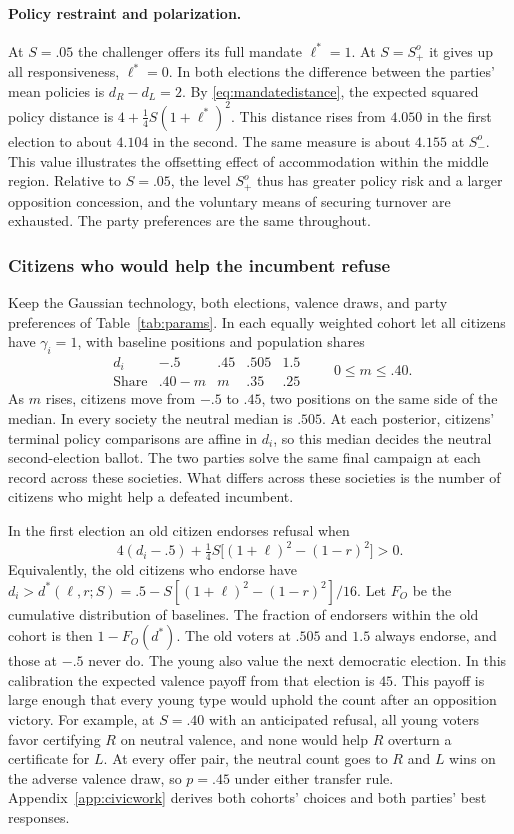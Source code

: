 \documentclass[11pt,letterpaper]{article}
\begin{document}
\paragraph{Policy restraint and polarization.}
At $S=.05$ the challenger offers its full mandate $\ell^*=1$. At $S=S_+^o$ it gives up all responsiveness, $\ell^*=0$. In both elections the difference between the parties' mean policies is $d_R-d_L=2$. By \eqref{eq:mandatedistance}, the expected squared policy distance is $4+\tfrac14 S(1+\ell^*)^2$. This distance rises from $4.050$ in the first election to about $4.104$ in the second. The same measure is about $4.155$ at $S_-^o$. This value illustrates the offsetting effect of accommodation within the middle region. Relative to $S=.05$, the level $S_+^o$ thus has greater policy risk and a larger opposition concession, and the voluntary means of securing turnover are exhausted. The party preferences are the same throughout.

\subsubsection{Citizens who would help the incumbent refuse}\label{sec:civicworked}

Keep the Gaussian technology, both elections, valence draws, and party preferences of Table~\ref{tab:params}. In each equally weighted cohort let all citizens have $\gamma_i=1$, with baseline positions and population shares
\[
 \begin{array}{c|cccc}
 d_i&-.5&.45&.505&1.5\\ \hline
 \text{Share}&.40-m&m&.35&.25
 \end{array}
 \qquad 0\le m\le .40 .
\]
As $m$ rises, citizens move from $-.5$ to $.45$, two positions on the same side of the median. In every society the neutral median is $.505$. At each posterior, citizens' terminal policy comparisons are affine in $d_i$, so this median decides the neutral second-election ballot. The two parties solve the same final campaign at each record across these societies. What differs across these societies is the number of citizens who might help a defeated incumbent.

In the first election an old citizen endorses refusal when
\[
 4(d_i-.5)+\tfrac14 S\big[(1+\ell)^2-(1-r)^2\big]>0 .
\]
Equivalently, the old citizens who endorse have $d_i>d^*(\ell,r;S)=.5-S[(1+\ell)^2-(1-r)^2]/16$. Let $F_O$ be the cumulative distribution of baselines. The fraction of endorsers within the old cohort is then $1-F_O(d^*)$. The old voters at $.505$ and $1.5$ always endorse, and those at $-.5$ never do. The young also value the next democratic election. In this calibration the expected valence payoff from that election is $45$. This payoff is large enough that every young type would uphold the count after an opposition victory. For example, at $S=.40$ with an anticipated refusal, all young voters favor certifying $R$ on neutral valence, and none would help $R$ overturn a certificate for $L$. At every offer pair, the neutral count goes to $R$ and $L$ wins on the adverse valence draw, so $p=.45$ under either transfer rule. Appendix~\ref{app:civicwork} derives both cohorts' choices and both parties' best responses.
\end{document}
